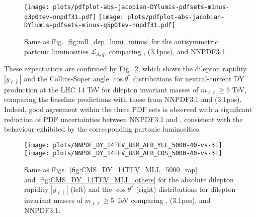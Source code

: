 \begin{figure}[!t]
 \centering
 \texttt{[image: plots/pdfplot-abs-jacobian-DYlumis-pdfsets-minus-q3p0tev-nnpdf31.pdf]}
 \texttt{[image: plots/pdfplot-abs-jacobian-DYlumis-pdfsets-minus-q5p0tev-nnpdf31.pdf]}
 \caption{Same as Fig.~\ref{fig:mll_dep_lumi_minus} for the antisymmetric partonic luminosities $\mathcal{L}_{A,q}$,
   comparing , (3.1pos), and NNPDF3.1.
 }    
 \label{fig:pdfplot-absDYlumis-pdfsets-minus-q5tev-nnpdf31}
\end{figure}

These expectations are confirmed by
Fig.~\ref{fig:CMS_DY_14TEV_COSTH_5000_YLL40-vs-31}, which shows the
dilepton rapidity $|y_{\ell\bar{\ell}}|$ 
and the Collins-Soper angle $\cos\theta^*$ distributions for neutral-current DY production
at the LHC 14 TeV for dilepton invariant masses of $m_{\ell\bar{\ell}}\ge 5$ TeV,
comparing the baseline  predictions with those from NNPDF3.1
and (3.1pos).
%
Indeed, 
good agreement within the three PDF sets is observed with a significant reduction
of PDF uncertainties between NNPDF3.1 and , consistent
with the behaviour exhibited by the corresponding partonic luminosities.

\begin{figure}[!t]
 \centering
 \texttt{[image: plots/NNPDF\_DY\_14TEV\_BSM\_AFB\_YLL\_5000-40-vs-31]}
 \texttt{[image: plots/NNPDF\_DY\_14TEV\_BSM\_AFB\_COS\_5000-40-vs-31]}
 \caption{Same as Figs.~\ref{fig:CMS_DY_14TEV_MLL_5000_rap}
and~\ref{fig:CMS_DY_14TEV_MLL_others}
for the absolute dilepton rapidity $|y_{\ell\bar{\ell}}|$ (left)
and the $\cos \theta^*$  (right) distributions
for dilepton invariant masses of $m_{\ell\bar{\ell}}\ge 5$ TeV
 comparing
, (3.1pos), and NNPDF3.1.
 }    
 \label{fig:CMS_DY_14TEV_COSTH_5000_YLL40-vs-31}
\end{figure}
